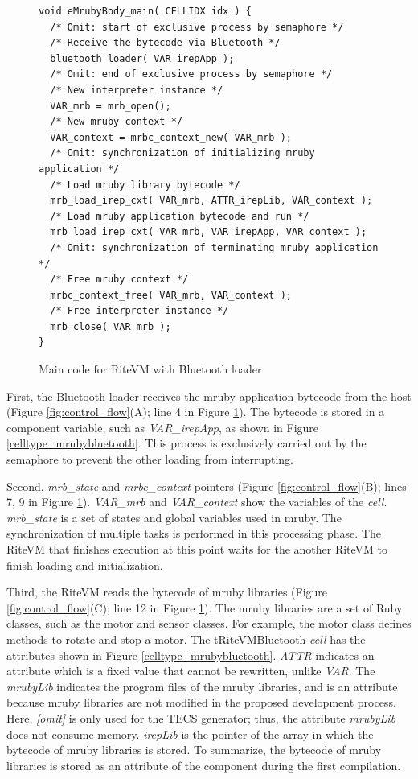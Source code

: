 \documentclass[conference]{IEEEtran/IEEEtran/IEEEtran}
\begin{document}
\begin{figure}[t]
\centering
\begin{lstlisting}
void eMrubyBody_main( CELLIDX idx ) {
  /* Omit: start of exclusive process by semaphore */
  /* Receive the bytecode via Bluetooth */
  bluetooth_loader( VAR_irepApp );
  /* Omit: end of exclusive process by semaphore */
  /* New interpreter instance */
  VAR_mrb = mrb_open();
  /* New mruby context */
  VAR_context = mrbc_context_new( VAR_mrb );
  /* Omit: synchronization of initializing mruby application */
  /* Load mruby library bytecode */
  mrb_load_irep_cxt( VAR_mrb, ATTR_irepLib, VAR_context );
  /* Load mruby application bytecode and run */
  mrb_load_irep_cxt( VAR_mrb, VAR_irepApp, VAR_context );
  /* Omit: synchronization of terminating mruby application */
  /* Free mruby context */
  mrbc_context_free( VAR_mrb, VAR_context );
  /* Free interpreter instance */
  mrb_close( VAR_mrb );
}

\end{lstlisting}
    \vspace{-3mm}
\caption{Main code for RiteVM with Bluetooth loader}
    \vspace{-3mm}
\label{maincode_mrubybluetooth}
\end{figure}


First, the Bluetooth loader receives the mruby application bytecode from the host (Figure \ref{fig:control_flow}(A); line 4 in Figure \ref{maincode_mrubybluetooth}).
The bytecode is stored in a component variable, such as {\it VAR\_irepApp}, as shown in Figure \ref{celltype_mrubybluetooth}.
This process is exclusively carried out by the semaphore to prevent the other loading from interrupting.

Second, {\it mrb\_state} and {\it mrbc\_context} pointers (Figure \ref{fig:control_flow}(B); lines 7, 9 in Figure \ref{maincode_mrubybluetooth}).
{\it VAR\_mrb} and {\it VAR\_context} show the variables of the {\it cell}.
{\it mrb\_state} is a set of states and global variables used in mruby.
The synchronization of multiple tasks is performed in this processing phase.
The RiteVM that finishes execution at this point waits for the another RiteVM to finish loading and initialization.

Third, the RiteVM reads the bytecode of mruby libraries (Figure \ref{fig:control_flow}(C); line 12 in Figure \ref{maincode_mrubybluetooth}).
The mruby libraries are a set of Ruby classes, such as the motor and sensor classes.
For example, the motor class defines methods to rotate and stop a motor.
The tRiteVMBluetooth {\it cell} has the attributes shown in Figure \ref{celltype_mrubybluetooth}.
{\it ATTR} indicates an attribute which is a fixed value that cannot be rewritten, unlike {\it VAR}.
The {\it mrubyLib} indicates the program files of the mruby libraries, and is an attribute because mruby libraries are not modified in the proposed development process.
Here, {\it [omit]} is only used for the TECS generator; thus, the attribute {\it mrubyLib} does not consume memory.
{\it irepLib} is the pointer of the array in which the bytecode of mruby libraries is stored.
To summarize, the bytecode of mruby libraries is stored as an attribute of the component during the first compilation.
\end{document}
